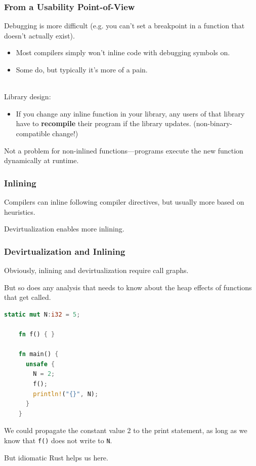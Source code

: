\begin{frame}
  \frametitle{From a Usability Point-of-View}

  
  Debugging is more difficult (e.g. you can't set a breakpoint in a function that
  doesn't actually exist).
  \begin{itemize}
    \item Most compilers simply won't inline code with debugging symbols on.
    \item Some do, but typically it's more of a pain.
  \end{itemize}~\\[1em]

  Library design:
  \begin{itemize}
    \item If you change any inline function in your library, any users
      of that library have to {\bf recompile} their program if the
      library updates. (non-binary-compatible change!)
  \end{itemize}
  Not a problem for non-inlined functions---programs execute the new function
      dynamically at runtime.

  
\end{frame}


\begin{frame}
\frametitle{Inlining}

 Compilers can inline following compiler directives, but usually more based on heuristics. 
 
 Devirtualization enables more inlining. 
 

\end{frame}

\begin{frame}[fragile]
\frametitle{Devirtualization and Inlining}

Obviously, inlining and devirtualization require call graphs. 

But so
does any analysis that needs to know about the heap effects of
functions that get called.


{\small
\begin{lstlisting}[language=Rust]
    static mut N:i32 = 5;

    fn f() { }

    fn main() {
      unsafe { 
        N = 2;
        f();
        println!("{}", N);  
      }
    }
    \end{lstlisting}
}

We could propagate the constant value 2 to the print statement,
as long as we know that {\tt f()} does not write to {\tt N}.

But idiomatic Rust helps us here.

\end{frame}

